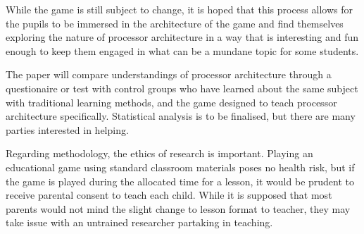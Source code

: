 \documentclass[a4paper]{article}
\begin{document}
While the game is still subject to change, it is hoped that this process allows for the pupils to be immersed in the architecture of the game and find themselves exploring the nature of processor architecture in a way that is interesting and fun enough to keep them engaged in what can be a mundane topic for some students. 

The paper will compare understandings of processor architecture through a questionaire or test with control groups who have learned about the same subject with traditional learning methods, and the game designed to teach processor architecture specifically. Statistical analysis is to be finalised, but there are many parties interested in helping.

Regarding methodology, the ethics of research is important. Playing an educational game using standard classroom materials poses no health risk, but if the game is played during the allocated time for a lesson, it would be prudent to receive parental consent to teach each child. While it is supposed that most parents would not mind the slight change to lesson format to teacher, they may take issue with an untrained researcher partaking in teaching. 
\end{document}
